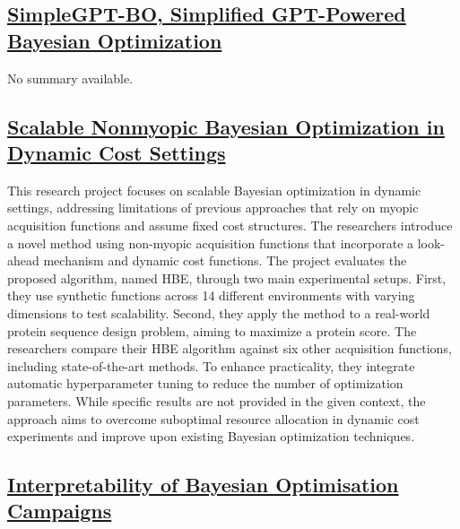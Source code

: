  \subsection*{\href{https://www.youtube.com/watch?v=Qr2cz5lxM64&ab_channel=ArifinSan}{SimpleGPT-BO, Simplified GPT-Powered Bayesian Optimization}}

No summary available.
 \subsection*{\href{https://youtu.be/CXweDiS_wbI}{Scalable Nonmyopic Bayesian Optimization in Dynamic Cost Settings}}

This research project focuses on scalable Bayesian optimization in dynamic settings, addressing limitations of previous approaches that rely on myopic acquisition functions and assume fixed cost structures. The researchers introduce a novel method using non-myopic acquisition functions\cite{jiang_efficient_2020} that incorporate a look-ahead mechanism and dynamic cost functions. The project evaluates the proposed algorithm, named HBE, through two main experimental setups. First, they use synthetic functions across 14 different environments with varying dimensions to test scalability. Second, they apply the method to a real-world protein sequence design problem, aiming to maximize a protein score. The researchers compare their HBE algorithm against six other acquisition functions, including state-of-the-art methods. To enhance practicality, they integrate automatic hyperparameter tuning to reduce the number of optimization parameters. While specific results are not provided in the given context, the approach aims to overcome suboptimal resource allocation in dynamic cost experiments and improve upon existing Bayesian optimization techniques.
 \subsection*{\href{https://www.youtube.com/watch?v=Cyyj9ySybZE}{Interpretability of Bayesian Optimisation Campaigns}}

